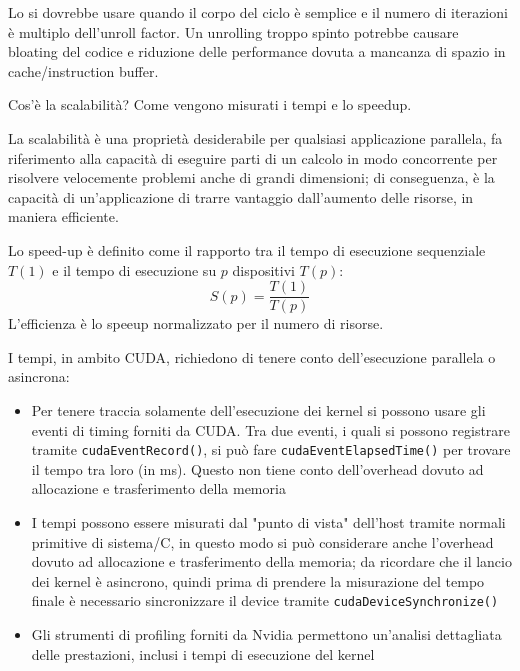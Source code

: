 \begin{questions}
\begin{solution}
    	Lo si dovrebbe usare quando il corpo del ciclo è semplice e il numero di iterazioni è multiplo dell'unroll factor. Un unrolling troppo spinto potrebbe causare bloating del codice e riduzione delle performance dovuta a mancanza di spazio in cache/instruction buffer.
    \end{solution}
    
    \question Cos'è la scalabilità? Come vengono misurati i tempi e lo speedup.
    
    \begin{solution}
    	La scalabilità è una proprietà desiderabile per qualsiasi applicazione parallela, fa riferimento alla capacità di eseguire parti di un calcolo in modo concorrente per risolvere velocemente problemi anche di grandi dimensioni; di conseguenza, è la capacità di un'applicazione di trarre vantaggio dall'aumento delle risorse, in maniera efficiente.
    	
    	 Lo speed-up è definito come il rapporto tra il tempo di esecuzione sequenziale $T(1)$ e il tempo di esecuzione su $p$ dispositivi $T(p)$:
    	 $$ S(p) = \frac{T(1)}{T(p)} $$
    	 L'efficienza è lo speeup normalizzato per il numero di risorse.
    	 
    	 I tempi, in ambito CUDA, richiedono di tenere conto dell'esecuzione parallela o asincrona: 
    	 \begin{itemize}
    	 	\item Per tenere traccia solamente dell'esecuzione dei kernel si possono usare gli eventi di timing forniti da CUDA. Tra due eventi, i quali si possono registrare tramite \texttt{cudaEventRecord()}, si può fare \texttt{cudaEventElapsedTime()} per trovare il tempo tra loro (in ms). Questo non tiene conto dell'overhead dovuto ad allocazione e trasferimento della memoria
    	 	
    	 	\item I tempi possono essere misurati dal "punto di vista" dell'host tramite normali primitive di sistema/C, in questo modo si può considerare anche l'overhead dovuto ad allocazione e trasferimento della memoria; da ricordare che il lancio dei kernel è asincrono, quindi prima di prendere la misurazione del tempo finale è necessario sincronizzare il device tramite \texttt{cudaDeviceSynchronize()}
    	 	
    	 	\item Gli strumenti di profiling forniti da Nvidia permettono un'analisi dettagliata delle prestazioni, inclusi i tempi di esecuzione del kernel
    	 \end{itemize}
    \end{solution}
    

\end{questions}
